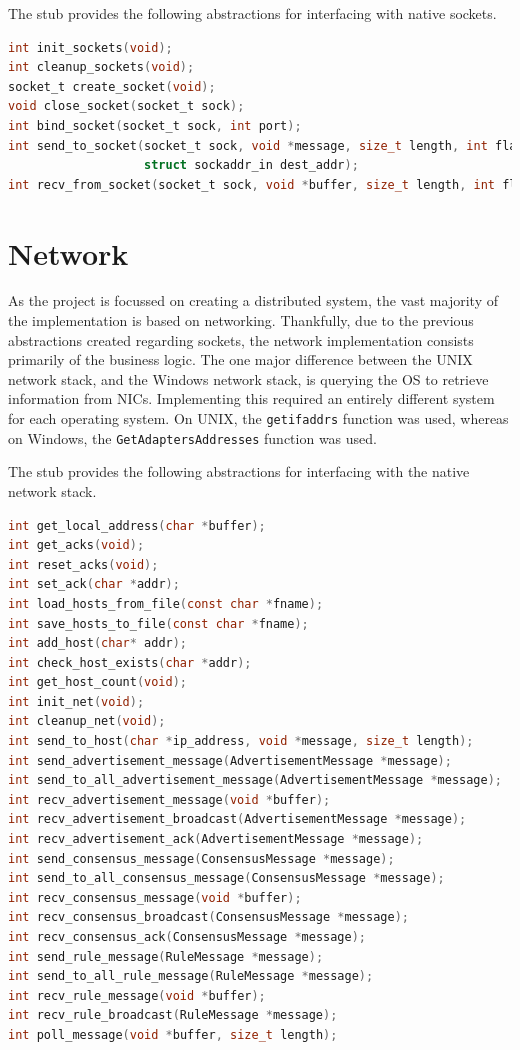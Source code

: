 \documentclass[a4paper, 11pt]{report}
\begin{document}
The \gls{stub} provides the following abstractions for interfacing with native sockets.
\begin{lstlisting}[language=c,style=c,caption=Socket API]
int init_sockets(void);
int cleanup_sockets(void);
socket_t create_socket(void);
void close_socket(socket_t sock);
int bind_socket(socket_t sock, int port);
int send_to_socket(socket_t sock, void *message, size_t length, int flags,
                   struct sockaddr_in dest_addr);
int recv_from_socket(socket_t sock, void *buffer, size_t length, int flags);
\end{lstlisting}

\section{Network}
As the project is focussed on creating a distributed system, the vast majority of the implementation is based on networking. Thankfully, due to the previous abstractions created regarding sockets, the network implementation consists primarily of the business logic. The one major difference between the UNIX network stack, and the Windows network stack, is querying the \acrshort{OS} to retrieve information from \acrshort{NIC}s. Implementing this required an entirely different system for each operating system. On UNIX, the \texttt{getifaddrs} function was used, whereas on Windows, the \texttt{GetAdaptersAddresses} function was used.

The \gls{stub} provides the following abstractions for interfacing with the native network stack.
\begin{lstlisting}[language=c,style=c,caption=Network API]
int get_local_address(char *buffer);
int get_acks(void);
int reset_acks(void);
int set_ack(char *addr);
int load_hosts_from_file(const char *fname);
int save_hosts_to_file(const char *fname);
int add_host(char* addr);
int check_host_exists(char *addr);
int get_host_count(void);
int init_net(void);
int cleanup_net(void);
int send_to_host(char *ip_address, void *message, size_t length);
int send_advertisement_message(AdvertisementMessage *message);
int send_to_all_advertisement_message(AdvertisementMessage *message);
int recv_advertisement_message(void *buffer);
int recv_advertisement_broadcast(AdvertisementMessage *message);
int recv_advertisement_ack(AdvertisementMessage *message);
int send_consensus_message(ConsensusMessage *message);
int send_to_all_consensus_message(ConsensusMessage *message);
int recv_consensus_message(void *buffer);
int recv_consensus_broadcast(ConsensusMessage *message);
int recv_consensus_ack(ConsensusMessage *message);
int send_rule_message(RuleMessage *message);
int send_to_all_rule_message(RuleMessage *message);
int recv_rule_message(void *buffer);
int recv_rule_broadcast(RuleMessage *message);
int poll_message(void *buffer, size_t length);
\end{lstlisting}
\end{document}
